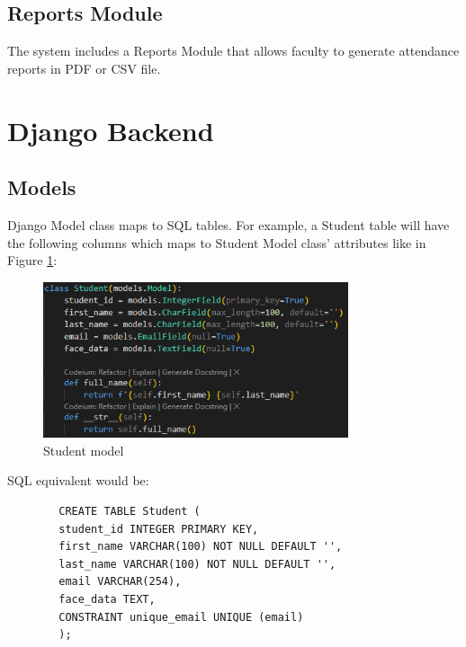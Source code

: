 \subsection{Reports Module}
	The system includes a Reports Module that allows faculty to generate attendance reports in PDF or CSV file. 
\section{Django Backend}
\subsection{Models}
	Django Model class maps to SQL tables. For example, a Student table will have the following columns which maps to Student Model class' attributes like in Figure \ref{fig:models}: 
	
	\begin{figure}[h] %
		\centering
		\includegraphics[width=0.8\textwidth]{figures/chapter4/models.png} %
		\caption{Student model}
		\label{fig:models}
	\end{figure}
	
	SQL equivalent would be:
	\begin{verbatim}
		CREATE TABLE Student (
		student_id INTEGER PRIMARY KEY,
		first_name VARCHAR(100) NOT NULL DEFAULT '',
		last_name VARCHAR(100) NOT NULL DEFAULT '',
		email VARCHAR(254),
		face_data TEXT,
		CONSTRAINT unique_email UNIQUE (email)
		);
	\end{verbatim}
